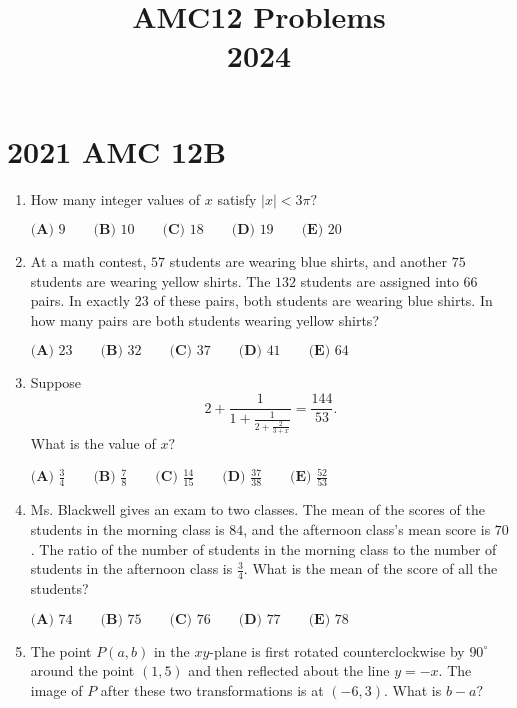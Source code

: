 \documentclass{article}
\title{AMC12 Problems \\ 2024}
\date{}
\begin{document}
\maketitle\thispagestyle{fancy}\newpage\section*{2021 AMC 12B}\begin{enumerate}[label=\arabic*., itemsep=0.5em]\item How many integer values of \(x\) satisfy \(|x|<3\pi?\)

\(\textbf{(A) }9 \qquad \textbf{(B) }10 \qquad \textbf{(C) }18 \qquad \textbf{(D) }19 \qquad \textbf{(E) }20\)\par \vspace{0.5em}\item At a math contest, \(57\) students are wearing blue shirts, and another \(75\) students are wearing yellow shirts. The \(132\) students are assigned into \(66\) pairs. In exactly \(23\) of these pairs, both students are wearing blue shirts. In how many pairs are both students wearing yellow shirts?

\(\textbf{(A) }23 \qquad \textbf{(B) }32 \qquad \textbf{(C) }37 \qquad \textbf{(D) }41 \qquad \textbf{(E) }64\)\par \vspace{0.5em}\item Suppose
\begin{equation*}
2+\frac{1}{1+\frac{1}{2+\frac{2}{3+x}}}=\frac{144}{53}.
\end{equation*}
What is the value of \(x?\)

\(\textbf{(A) }\frac34 \qquad \textbf{(B) }\frac78 \qquad \textbf{(C) }\frac{14}{15} \qquad \textbf{(D) }\frac{37}{38} \qquad \textbf{(E) }\frac{52}{53}\)\par \vspace{0.5em}\item Ms. Blackwell gives an exam to two classes. The mean of the scores of the students in the morning class is \(84\), and the afternoon class's mean score is \(70\). The ratio of the number of students in the morning class to the number of students in the afternoon class is \(\frac34\). What is the mean of the score of all the students?

\(\textbf{(A) }74 \qquad \textbf{(B) }75 \qquad \textbf{(C) }76 \qquad \textbf{(D) }77 \qquad \textbf{(E) }78\)\par \vspace{0.5em}\item The point \(P(a,b)\) in the \(xy\)-plane is first rotated counterclockwise by \(90^\circ\) around the point \((1,5)\) and then reflected about the line \(y=-x\). The image of \(P\) after these two transformations is at \((-6,3)\). What is \(b-a?\)


\end{enumerate}
\end{document}
